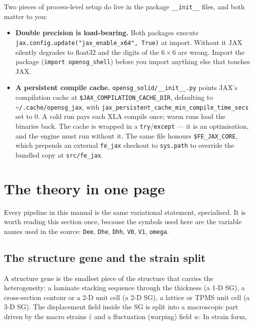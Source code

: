 Two pieces of process-level setup do live in the package \texttt{\_\_init\_\_}
files, and both matter to you:

\begin{itemize}
\item \textbf{Double precision is load-bearing.} Both packages execute
      \texttt{jax.config.update("jax\_enable\_x64", True)} at import. Without
      it JAX silently degrades to float32 and the digits of the $6\times6$ are
      wrong. Import the package (\texttt{import opensg\_shell}) before you
      import anything else that touches JAX.
\item \textbf{A persistent compile cache.} \texttt{opensg\_solid/\_\_init\_\_.py}
      points JAX's compilation cache at \verb|$JAX_COMPILATION_CACHE_DIR|,
      defaulting to \verb|~/.cache/opensg_jax|, with
      \texttt{jax\_persistent\_cache\_min\_compile\_time\_secs} set to $0$. A
      cold run pays each XLA compile once; warm runs load the binaries back. The
      cache is wrapped in a \texttt{try}/\texttt{except} --- it is an
      optimisation, and the engine must run without it. The same file honours
      \verb|$FE_JAX_CORE|, which prepends an external \texttt{fe\_jax} checkout
      to \texttt{sys.path} to override the bundled copy at \texttt{src/fe\_jax}.
\end{itemize}

\section{The theory in one page}
\label{sec:theory-one-page}

Every pipeline in this manual is the same variational statement, specialised. It
is worth reading this section once, because the symbols used here are the
variable names used in the source: \texttt{Dee}, \texttt{Dhe}, \texttt{Dhh},
\texttt{V0}, \texttt{V1}, \texttt{omega}.

\subsection{The structure gene and the strain split}

A structure gene is the smallest piece of the structure that carries the
heterogeneity: a laminate stacking sequence through the thickness (a 1-D SG), a
cross-section contour or a 2-D unit cell (a 2-D SG), a lattice or TPMS unit cell
(a 3-D SG). The displacement field inside the SG is split into a macroscopic
part driven by the macro strains $\bar\varepsilon$ and a fluctuation (warping)
field $w$. In strain form,


